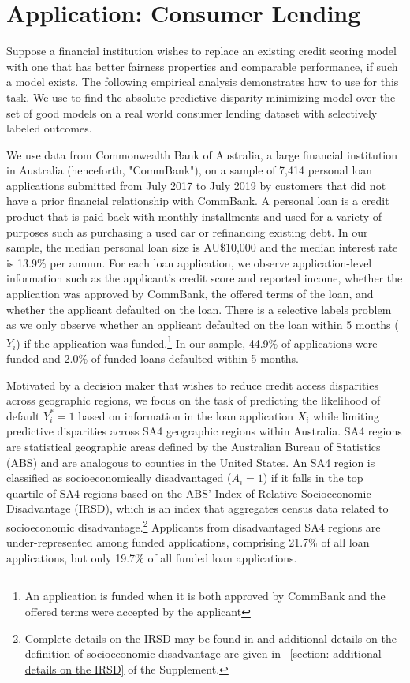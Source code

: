 \documentclass{article}
\begin{document}
\section{Application: Consumer Lending }\label{section: consumer lending application}
Suppose a financial institution wishes to replace an existing credit scoring model with one that has better fairness properties and comparable performance, if such a model exists. 
The following empirical analysis demonstrates how to use \fairs for this task. We use \fairs to find the absolute predictive disparity-minimizing model over the set of good models on a real world consumer lending dataset with selectively labeled outcomes.

We use data from Commonwealth Bank of Australia, a large financial institution in Australia (henceforth, "CommBank"), on a sample of 7,414 personal loan applications submitted from July 2017 to July 2019 by customers that did not have a prior financial relationship with CommBank. A personal loan is a credit product that is paid back with monthly installments and used for a variety of purposes such as purchasing a used car or refinancing existing debt. In our sample, the median personal loan size is AU\$10,000 and the median interest rate is 13.9\% per annum. For each loan application, we observe application-level information such as the applicant's credit score and reported income, whether the application was approved by CommBank, the offered terms of the loan, and whether the applicant defaulted on the loan. There is a selective labels problem as we only observe whether an applicant defaulted on the loan within 5 months ($Y_i$) if the application was funded.\footnote{An application is funded when it is both approved by CommBank and the offered terms were accepted by the applicant}  In our sample, 44.9\% of applications were funded and 2.0\% of funded loans defaulted within 5 months.

Motivated by a decision maker that wishes to reduce credit access disparities across geographic regions, we focus on the task of predicting the likelihood of default $Y^*_i = 1$ based on information in the loan application $X_i$ while limiting predictive disparities across SA4 geographic regions within Australia. SA4 regions are statistical geographic areas defined by the Australian Bureau of Statistics (ABS) and are analogous to counties in the United States. An SA4 region is classified as socioeconomically disadvantaged ($A_i = 1$) if it falls in the top quartile of SA4 regions based on the ABS' Index of Relative Socioeconomic Disadvantage (IRSD), which is an index that aggregates census data related to socioeconomic disadvantage.\footnote{Complete details on the IRSD may be found in \cite{SEIFA(16)} and additional details on the definition of socioeconomic disadvantage are given in \textsection~\ref{section: additional details on the IRSD} of the Supplement.} Applicants from disadvantaged SA4 regions are under-represented among funded applications, comprising 21.7\% of all loan applications, but only 19.7\% of all funded loan applications.
\end{document}
